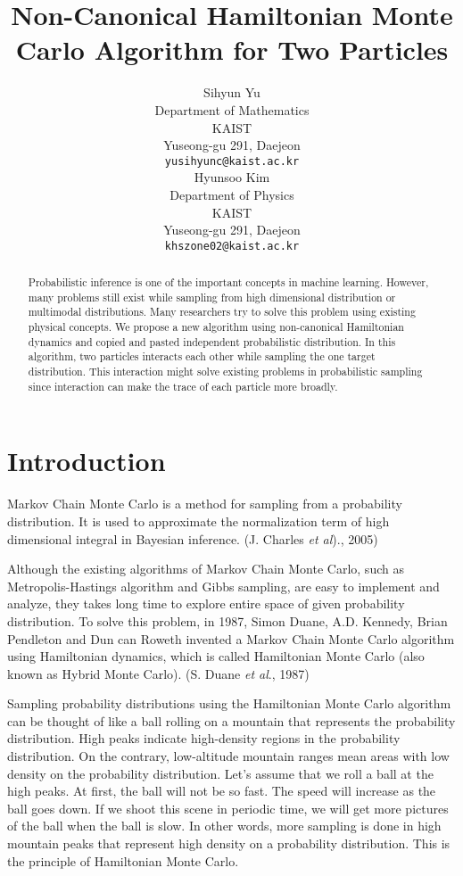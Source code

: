\documentclass{article}
\title{Non-Canonical Hamiltonian Monte Carlo Algorithm for Two Particles}
\author{%
  Sihyun Yu\\
  Department of Mathematics\\
  KAIST\\
  Yuseong-gu 291, Daejeon \\
  \texttt{yusihyunc@kaist.ac.kr} \\
  \And
  Hyunsoo Kim\\
  Department of Physics\\
  KAIST\\
  Yuseong-gu 291, Daejeon \\
  \texttt{khszone02@kaist.ac.kr} \\
  }
\begin{document}

\maketitle

\begin{abstract}
Probabilistic inference is one of the important concepts in machine learning. However, many problems still exist while sampling from high dimensional distribution or multimodal distributions. Many researchers try to solve this problem using existing physical concepts. We propose a new algorithm using non-canonical Hamiltonian dynamics and copied and pasted independent probabilistic distribution.  In this algorithm, two particles interacts each other while sampling the one target distribution. This interaction might solve existing problems in probabilistic sampling since interaction can make the trace of each particle more broadly.   
 \end{abstract}
\section{Introduction}
Markov Chain Monte Carlo is a method for sampling from a probability distribution. It is used to approximate the normalization term of high dimensional integral in Bayesian inference. (J. Charles \textit{et al})., 2005)

Although the existing algorithms of Markov Chain Monte Carlo, such as Metropolis-Hastings algorithm and Gibbs sampling, are easy to implement and analyze, they takes long time to explore entire space of given probability distribution. To solve this problem, in 1987, Simon Duane, A.D. Kennedy, Brian Pendleton and Dun can Roweth invented a Markov Chain Monte Carlo algorithm using Hamiltonian dynamics, which is called Hamiltonian Monte Carlo (also known as Hybrid Monte Carlo). (S. Duane \textit{et al}., 1987)

Sampling probability distributions using the Hamiltonian Monte Carlo algorithm can be thought of like a ball rolling on a mountain that represents the probability distribution. High peaks indicate high-density regions in the probability distribution. On the contrary, low-altitude mountain ranges mean areas with low density on the probability distribution. Let's assume that we roll a ball at the high peaks. At first, the ball will not be so fast. The speed will increase as the ball goes down. If we shoot this scene in periodic time, we will get more pictures of the ball when the ball is slow. In other words, more sampling is done in high mountain peaks that represent high density on a probability distribution. This is the principle of Hamiltonian Monte Carlo.
\end{document}
